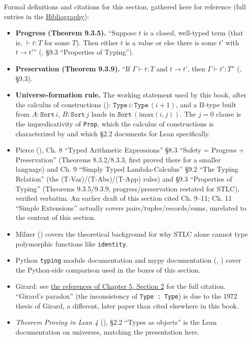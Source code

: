 Formal definitions and citations for this section, gathered here for reference (full entries in the \hyperref[sec:root:bibliography:1]{Bibliography}):

\begin{itemize}
\tightlist
\item
  \textbf{Progress (Theorem 9.3.5).} ``Suppose \(t\) is a closed, well-typed term (that is, \(\vdash t : T\) for some \(T\)). Then either \(t\) is a value or else there is some \(t'\) with \(t \to t'\)'' (\cite{Pierce2002}, §9.3 ``Properties of Typing'').
\item
  \textbf{Preservation (Theorem 9.3.9).} ``If \(\Gamma \vdash t : T\) and \(t \to t'\), then \(\Gamma \vdash t' : T\)'' (\cite{Pierce2002}, §9.3).
\item
  \textbf{Universe-formation rule.} The working statement used by this book, after the calculus of constructions (\cite{CoquandHuet1988}): \(\mathtt{Type}\,i : \mathtt{Type}\,(i+1)\), and a Π-type built from \(A : \mathtt{Sort}\,i\), \(B : \mathtt{Sort}\,j\) lands in \(\mathtt{Sort}\,(\mathrm{imax}(i,j))\). The \(j = 0\) clause is the impredicativity of \texttt{Prop}, which the calculus of constructions is characterized by and which \cite{TPIL4} §2.2 documents for Lean specifically.
\item
  Pierce (\cite{Pierce2002}), Ch. 8 ``Typed Arithmetic Expressions'' §8.3 ``Safety = Progress + Preservation'' (Theorems 8.3.2/8.3.3, first proved there for a smaller language) and Ch. 9 ``Simply Typed Lambda-Calculus'' §9.2 ``The Typing Relation'' (the (T-Var)/(T-Abs)/(T-App) rules) and §9.3 ``Properties of Typing'' (Theorems 9.3.5/9.3.9, progress/preservation restated for STLC), verified verbatim. An earlier draft of this section cited Ch. 9--11; Ch. 11 ``Simple Extensions'' actually covers pairs/tuples/records/sums, unrelated to the content of this section.
\item
  Milner (\cite{Milner1978}) covers the theoretical background for why STLC alone cannot type polymorphic functions like \texttt{identity}.
\item
  Python \texttt{typing} module documentation and mypy documentation (\cite{PythonTyping}, \cite{MypyDocs}) cover the Python-side comparison used in the boxes of this section.
\item
  Girard: see \hyperref[sec:05-rigor-check:02-universes:1]{the references of Chapter 5, Section 2} for the full citation. ``Girard's paradox'' (the inconsistency of \texttt{Type : Type}) is due to the 1972 thesis of Girard, a different, later paper than \cite{Girard1971} cited elsewhere in this book.
\item
  \emph{Theorem Proving in Lean 4} (\cite{TPIL4}), §2.2 ``Types as objects'' is the Lean documentation on universes, matching the presentation here.
\end{itemize}
